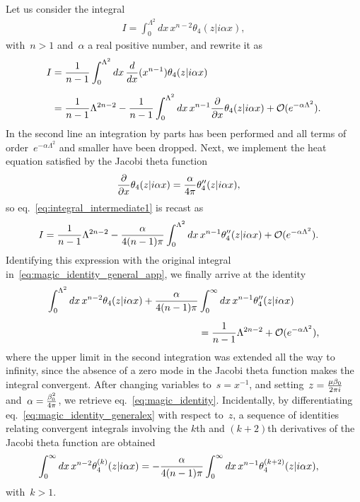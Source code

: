 \documentclass[11pt,a4paper]{article}
\begin{document}
Let us consider the integral
\begin{align}
I=\int_{0}^{\Lambda^{2}}dx\,x^{n-2}\theta_{4}(z|i\alpha x),
\label{eq:magic_identity_general_app}
\end{align}
with~$n>1$ and~$\alpha$ a real positive number, and rewrite it as
\begin{align}
I&={1\over n-1}\int_{0}^{\Lambda^{2}}dx\,{d\over dx}(x^{n-1})\theta_{4}(z|i\alpha x)
\nonumber \\[0.2cm]
&={1\over n-1}\Lambda^{2n-2}-{1\over n-1}\int_{0}^{\Lambda^{2}}dx\,x^{n-1}{\partial\over\partial x}
\theta_{4}(z|i\alpha x)+\mathcal{O}(e^{-\alpha\Lambda^{2}}).
\label{eq:integral_intermediate1}
\end{align}
In the second line an integration by parts has been performed and
all terms of order~$e^{-\alpha\Lambda^{2}}$ and smaller have been dropped.
Next, we
implement the
heat equation satisfied by the Jacobi theta function~\cite{ErdelyiVol2}
\begin{align}
{\partial\over\partial x}\theta_{4}(z|i\alpha x)&={\alpha\over 4\pi}\theta_{4}''(z|i\alpha x),
\end{align}
so eq.~\eqref{eq:integral_intermediate1} is recast as
\begin{align}
I&={1\over n-1}\Lambda^{2n-2}-{\alpha \over 4(n-1)\pi}
\int_{0}^{\Lambda^{2}}dx\,x^{n-1}
\theta_{4}''(z|i\alpha x)+\mathcal{O}(e^{-\alpha\Lambda^{2}}).
\end{align}
Identifying this expression with the original integral in~\eqref{eq:magic_identity_general_app}, we 
finally arrive at the identity
\begin{align}
\int_{0}^{\Lambda^{2}}dx\,x^{n-2}\theta_{4}(z|i\alpha x)
+{\alpha \over 4(n-1)\pi}
&\int_{0}^{\infty}dx\,x^{n-1}
\theta_{4}''(z|i\alpha x) \nonumber \\[0.2cm]
&={1\over n-1}\Lambda^{2n-2}
+\mathcal{O}(e^{-\alpha\Lambda^{2}}),
\label{eq:magic_identity_generalex}
\end{align}
where the upper limit in the second integration was extended all the way to infinity, since
the absence of a zero mode in the Jacobi theta function makes the integral convergent.
After changing variables to~$s=x^{-1}$,
and setting~$z={\mu\beta_{0}\over 2\pi i}$ 
and~$\alpha={\beta_{0}^{2}\over 4\pi}$,
we retrieve eq.~\eqref{eq:magic_identity}. Incidentally, by differentiating 
eq.~\eqref{eq:magic_identity_generalex} with respect to~$z$, a sequence of identities relating convergent
integrals involving the $k$th and $(k+2)$th derivatives of the Jacobi theta function are obtained
\begin{align}
\int_{0}^{\infty}dx\,x^{n-2}\theta_{4}^{(k)}(z|i\alpha x)
=-{\alpha \over 4(n-1)\pi}
&\int_{0}^{\infty}dx\,x^{n-1}
\theta_{4}^{(k+2)}(z|i\alpha x),
\end{align} 
with~$k>1$.







\end{document}
